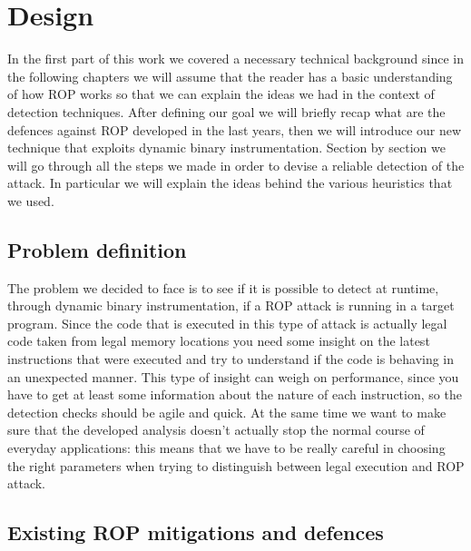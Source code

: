 \documentclass[Lau,binding=0.6cm]{sapthesis}
\begin{document}
\chapter{Design}

In the first part of this work we covered a necessary technical background since in the following chapters we will assume that the reader has a basic understanding of how ROP works so that we can explain the ideas we had in the context of detection techniques. After defining our goal we will briefly recap what are the defences against ROP developed in the last years, then we will introduce our new technique that exploits dynamic binary instrumentation. Section by section we will go through all the steps we made in order to devise a reliable detection of the attack. In particular we will explain the ideas behind the various heuristics that we used.

\section{Problem definition}

The problem we decided to face is to see if it is possible to detect at runtime, through dynamic binary instrumentation, if a ROP attack is running in a target program. Since the code that is executed in this type of attack is actually legal code taken from legal memory locations you need some insight on the latest instructions that were executed and try to understand if the code is behaving in an unexpected manner. This type of insight can weigh on performance, since you have to get at least some information about the nature of each instruction, so the detection checks should be agile and quick. At the same time we want to make sure that the developed analysis doesn’t actually stop the normal course of everyday applications: this means that we have to be really careful in choosing the right parameters when trying to distinguish between legal execution and ROP attack.

\section{Existing ROP mitigations and defences}
\end{document}
